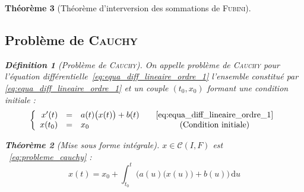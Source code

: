 \documentclass[11pt,a4paper]{report}
\newtheorem{theorem}{Théorème}[chapter]
\theoremstyle{definition}
\newtheorem{dfn}[theorem]{Définition}
\begin{document}
\begin{theorem}[Théorème d'interversion des sommations de \textsc{Fubini}]
{{%
\subsection{Problème de \textsc{Cauchy}} %
\label{sub:probleme_de_cauchy}
\begin{dfn}[Problème de \textsc{Cauchy}]
     On appelle \emph{problème de \textsc{Cauchy}} pour l'équation différentielle~\eqref{eq:equa_diff_lineaire_ordre_1} l'ensemble constitué par \eqref{eq:equa_diff_lineaire_ordre_1} et un couple $(t_0,x_0)$ formant une condition initiale :
     \begin{equation}\label{eq:probleme_cauchy}
     \left\lbrace
     \begin{array}{rcl@{\qquad}c}
          x'(t) &=& a(t)\big( x(t)\big) +b(t)  &\eqref{eq:equa_diff_lineaire_ordre_1}\\
          x(t_0) &=& x_0                       &\text{(Condition initiale)}
     \end{array}
     \right.
     \end{equation}
\end{dfn}
\begin{theorem}[Mise sous forme intégrale]
     $x\in \mathcal{C}(I,F)$ est ~\eqref{eq:probleme_cauchy} \Longleftrightarrow :
     \begin{equation}
     x(t) = x_0 + \int_{t_0}^t \Big( a(u)\big(x(u)\big) + b(u)\Big) \,\mathrm{d} u
     \end{equation}
\end{theorem}

}}
\end{theorem}
\end{document}
